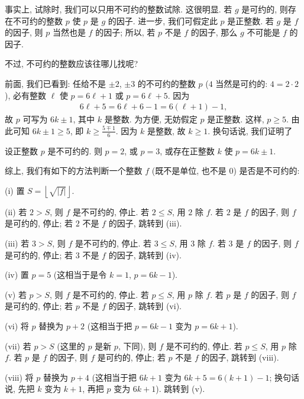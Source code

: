 事实上, 试除时, 我们可以只用不可约的整数试除. 这很明显. 若 $g$ 是可约的, 则存在不可约的整数 $p$ 使 $p$ 是 $g$ 的因子. 进一步, 我们可假定此 $p$ 是正整数. 若 $g$ 是 $f$ 的因子, 则 $p$ 当然也是 $f$ 的因子; 所以, 若 $p$ 不是 $f$ 的因子, 那么 $g$ 不可能是 $f$ 的因子.

不过, 不可约的整数应该往哪儿找呢?

前面, 我们已看到: 任给不是 $\pm 2$, $\pm 3$ 的不可约的整数 $p$ ($4$ 当然是可约的: $4 = 2 \cdot 2$), 必有整数 $\ell$ 使 $p = 6\ell + 1$ 或 $p = 6\ell + 5$. 因为
\begin{align*}
    6\ell + 5 = 6\ell + 6 - 1 = 6(\ell + 1) - 1,
\end{align*}
故 $p$ 可写为 $6k \pm 1$, 其中 $k$ 是整数. 为方便, 无妨假定 $p$ 是正整数. 这样, $p \geq 5$. 由此可知 $6k \pm 1 \geq 5$, 即 $k \geq \frac{5 \mp 1}{6}$. 因为 $k$ 是整数, 故 $k \geq 1$. 换句话说, 我们证明了
\begin{proposition}
    设正整数 $p$ 是不可约的. 则 $p = 2$, 或 $p = 3$, 或存在正整数 $k$ 使 $p = 6k \pm 1$.
\end{proposition}

综上, 我们有如下的方法判断一个整数 $f$ (既不是单位, 也不是 $0$) 是否是不可约的:

(i) 置 $S = \left \lfloor \sqrt{|f|} \right \rfloor$.

(ii) 若 $2 > S$, 则 $f$ 是不可约的, 停止. 若 $2 \leq S$, 用 $2$ 除 $f$. 若 $2$ 是 $f$ 的因子, 则 $f$ 是可约的, 停止; 若 $2$ 不是 $f$ 的因子, 跳转到 (iii).

(iii) 若 $3 > S$, 则 $f$ 是不可约的, 停止. 若 $3 \leq S$, 用 $3$ 除 $f$. 若 $3$ 是 $f$ 的因子, 则 $f$ 是可约的, 停止; 若 $3$ 不是 $f$ 的因子, 跳转到 (iv).

(iv) 置 $p = 5$ (这相当于是令 $k = 1$, $p = 6k - 1$).

(v) 若 $p > S$, 则 $f$ 是不可约的, 停止. 若 $p \leq S$, 用 $p$ 除 $f$. 若 $p$ 是 $f$ 的因子, 则 $f$ 是可约的, 停止; 若 $p$ 不是 $f$ 的因子, 跳转到 (vi).

(vi) 将 $p$ 替换为 $p + 2$ (这相当于把 $p = 6k - 1$ 变为 $p = 6k + 1$).

(vii) 若 $p > S$ (这里的 $p$ 是新 $p$, 下同), 则 $f$ 是不可约的, 停止. 若 $p \leq S$, 用 $p$ 除 $f$. 若 $p$ 是 $f$ 的因子, 则 $f$ 是可约的, 停止; 若 $p$ 不是 $f$ 的因子, 跳转到 (viii).

(viii) 将 $p$ 替换为 $p + 4$ (这相当于把 $6k + 1$ 变为 $6k + 5 = 6(k+1) - 1$; 换句话说, 先把 $k$ 变为 $k+1$, 再把 $p$ 变为 $6k+1$). 跳转到 (v).


